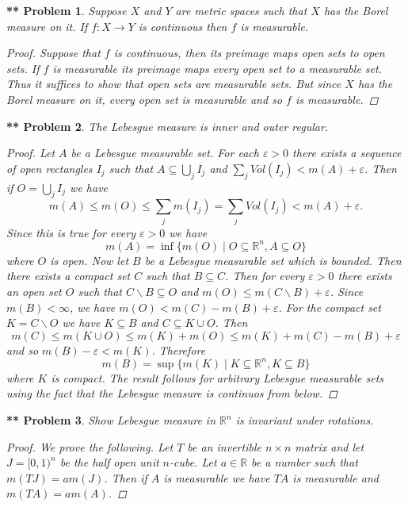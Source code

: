 \documentclass{article}
\newtheorem{**}{** Problem}
\begin{document}
\begin{flushleft}
\begin{**}
Suppose $X$ and $Y$ are metric spaces such that $X$ has the Borel measure on it. If $f : X \rightarrow Y$ is continuous then $f$ is measurable.
\begin{proof}
Suppose that $f$ is continuous, then its preimage maps open sets to open sets. If $f$ is measurable its preimage maps every open set to a measurable set. Thus it suffices to show that open sets are measurable sets. But since $X$ has the Borel measure on it, every open set is measurable and so $f$ is measurable.
\end{proof}
\end{**}

\begin{**}
The Lebesgue measure is inner and outer regular.
\begin{proof}
Let $A$ be a Lebesgue measurable set. For each $\varepsilon > 0$ there exists a sequence of open rectangles $I_j$ such that $A \subseteq \bigcup_{j} I_j$ and $\sum_{j} Vol(I_j) < m(A) + \varepsilon$. Then if $O = \bigcup_j I_j$ we have
\[
m(A) \leq m(O) \leq \sum_{j} m(I_j) = \sum_{j} Vol(I_j) < m(A) + \varepsilon.
\]
Since this is true for every $\varepsilon > 0$ we have
\[
m(A) = \inf \{m(O) \mid O \subseteq \mathbb{R}^n, A \subseteq O\}
\]
where $O$ is open. Now let $B$ be a Lebesgue measurable set which is bounded. Then there exists a compact set $C$ such that $B \subseteq C$. Then for every $\varepsilon > 0$ there exists an open set $O$ such that $C \backslash B \subseteq O$ and $m(O) \leq m(C \backslash B) + \varepsilon$. Since $m(B) < \infty$, we have $m(O) < m(C) - m(B) + \varepsilon$. For the compact set $K = C \backslash O$ we have $K \subseteq B$ and $C \subseteq K \cup O$. Then
\[
m(C) \leq m(K \cup O) \leq m(K) + m(O) \leq m(K) + m(C) - m(B) + \varepsilon
\]
and so $m(B) - \varepsilon < m(K)$. Therefore
\[
m(B) = \sup \{m(K) \mid K \subseteq \mathbb{R}^n, K \subseteq B\}
\]
where $K$ is compact. The result follows for arbitrary Lebesgue measurable sets using the fact that the Lebesgue measure is continuos from below.
\end{proof}
\end{**}

\begin{**}
Show Lebesgue measure in $\mathbb{R}^n$ is invariant under rotations.
\begin{proof}
We prove the following. Let $T$ be an invertible $n \times n$ matrix and let $J = [0,1)^n$ be the half open unit $n$-cube. Let $a \in \mathbb{R}$ be a number such that $m(TJ) = am(J)$. Then if $A$ is measurable we have $TA$ is measurable and $m(TA) = am(A)$.\newline


\end{proof}
\end{**}
\end{flushleft}
\end{document}
